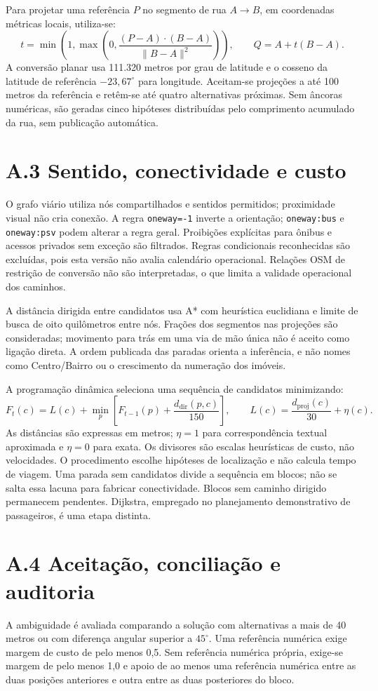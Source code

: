 \documentclass[12pt,oneside,a4paper,brazil]{abntex2}
\begin{document}
\begin{apendicesenv}
Para projetar uma referência $P$ no segmento de rua $A\rightarrow B$, em coordenadas métricas locais, utiliza-se:
\[
 t=\min\left(1,\max\left(0,\frac{(P-A)\cdot(B-A)}{\lVert B-A\rVert^2}\right)\right),
 \qquad Q=A+t(B-A).
\]
A conversão planar usa 111.320 metros por grau de latitude e o cosseno da latitude de referência $-23{,}67^\circ$ para longitude. Aceitam-se projeções a até 100 metros da referência e retêm-se até quatro alternativas próximas. Sem âncoras numéricas, são geradas cinco hipóteses distribuídas pelo comprimento acumulado da rua, sem publicação automática.

\section*{A.3 Sentido, conectividade e custo}
O grafo viário utiliza nós compartilhados e sentidos permitidos; proximidade visual não cria conexão. A regra \texttt{oneway=-1} inverte a orientação; \texttt{oneway:bus} e \texttt{oneway:psv} podem alterar a regra geral. Proibições explícitas para ônibus e acessos privados sem exceção são filtrados. Regras condicionais reconhecidas são excluídas, pois esta versão não avalia calendário operacional. Relações OSM de restrição de conversão não são interpretadas, o que limita a validade operacional dos caminhos.

A distância dirigida entre candidatos usa A* com heurística euclidiana e limite de busca de oito quilômetros entre nós. Frações dos segmentos nas projeções são consideradas; movimento para trás em uma via de mão única não é aceito como ligação direta. A ordem publicada das paradas orienta a inferência, e não nomes como Centro/Bairro ou o crescimento da numeração dos imóveis.

A programação dinâmica seleciona uma sequência de candidatos minimizando:
\[
 F_t(c)=L(c)+\min_p\left[F_{t-1}(p)+\frac{d_{\mathrm{dir}}(p,c)}{150}\right],
 \qquad L(c)=\frac{d_{\mathrm{proj}}(c)}{30}+\eta(c).
\]
As distâncias são expressas em metros; $\eta=1$ para correspondência textual aproximada e $\eta=0$ para exata. Os divisores são escalas heurísticas de custo, não velocidades. O procedimento escolhe hipóteses de localização e não calcula tempo de viagem. Uma parada sem candidatos divide a sequência em blocos; não se salta essa lacuna para fabricar conectividade. Blocos sem caminho dirigido permanecem pendentes. Dijkstra, empregado no planejamento demonstrativo de passageiros, é uma etapa distinta.

\section*{A.4 Aceitação, conciliação e auditoria}
A ambiguidade é avaliada comparando a solução com alternativas a mais de 40 metros ou com diferença angular superior a $45^\circ$. Uma referência numérica exige margem de custo de pelo menos 0,5. Sem referência numérica própria, exige-se margem de pelo menos 1,0 e apoio de ao menos uma referência numérica entre as duas posições anteriores e outra entre as duas posteriores do bloco.


\end{apendicesenv}
\end{document}
